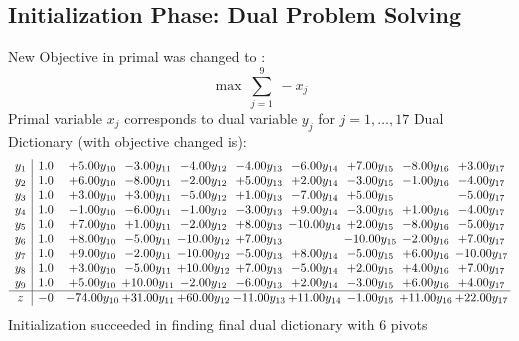 \documentclass[9pt]{article}
\begin{document}
\subsection{Initialization Phase: Dual Problem Solving}
New Objective in primal was changed to : \[ \max\ \sum_{j=1}^{9}\ - x_j \] 
Primal variable $x_j$ corresponds to dual variable $y_j$ for $j = 1,\ldots,17$
Dual Dictionary (with objective changed is): 
\[\begin{array}{c| c c@{\hskip 2pt} c@{\hskip 2pt} c@{\hskip 2pt} c@{\hskip 2pt} c@{\hskip 2pt} c@{\hskip 2pt} c@{\hskip 2pt} c@{\hskip 2pt} }
 y_{1}   &  1.0 & +  5.00 y_{10} & -3.00 y_{11} & -4.00 y_{12} & -4.00 y_{13} & -6.00 y_{14} & +  7.00 y_{15} & -8.00 y_{16} & +  3.00 y_{17}\\
 y_{2}   &  1.0 & +  6.00 y_{10} & -8.00 y_{11} & -2.00 y_{12} & +  5.00 y_{13} & +  2.00 y_{14} & -3.00 y_{15} & -1.00 y_{16} & -4.00 y_{17}\\
 y_{3}   &  1.0 & +  3.00 y_{10} & +  3.00 y_{11} & -5.00 y_{12} & +  1.00 y_{13} & -7.00 y_{14} & +  5.00 y_{15} &   & -5.00 y_{17}\\
 y_{4}   &  1.0 & -1.00 y_{10} & -6.00 y_{11} & -1.00 y_{12} & -3.00 y_{13} & +  9.00 y_{14} & -3.00 y_{15} & +  1.00 y_{16} & -4.00 y_{17}\\
 y_{5}   &  1.0 & +  7.00 y_{10} & +  1.00 y_{11} & -2.00 y_{12} & +  8.00 y_{13} & -10.00 y_{14} & +  2.00 y_{15} & -8.00 y_{16} & -5.00 y_{17}\\
 y_{6}   &  1.0 & +  8.00 y_{10} & -5.00 y_{11} & -10.00 y_{12} & +  7.00 y_{13} &   & -10.00 y_{15} & -2.00 y_{16} & +  7.00 y_{17}\\
 y_{7}   &  1.0 & +  9.00 y_{10} & -2.00 y_{11} & -10.00 y_{12} & -5.00 y_{13} & +  8.00 y_{14} & -5.00 y_{15} & +  6.00 y_{16} & -10.00 y_{17}\\
 y_{8}   &  1.0 & +  3.00 y_{10} & -5.00 y_{11} & + 10.00 y_{12} & +  7.00 y_{13} & -5.00 y_{14} & +  2.00 y_{15} & +  4.00 y_{16} & +  7.00 y_{17}\\
 y_{9}   &  1.0 & +  5.00 y_{10} & + 10.00 y_{11} & -2.00 y_{12} & -6.00 y_{13} & +  2.00 y_{14} & -3.00 y_{15} & +  6.00 y_{16} & +  4.00 y_{17}\\
\hline
z    &  -0 & -74.00 y_{10} & + 31.00 y_{11} & + 60.00 y_{12} & -11.00 y_{13} & + 11.00 y_{14} & -1.00 y_{15} & + 11.00 y_{16} & + 22.00 y_{17}\\
\end{array}\]
Initialization succeeded in finding final dual dictionary with 6 pivots
\end{document}
